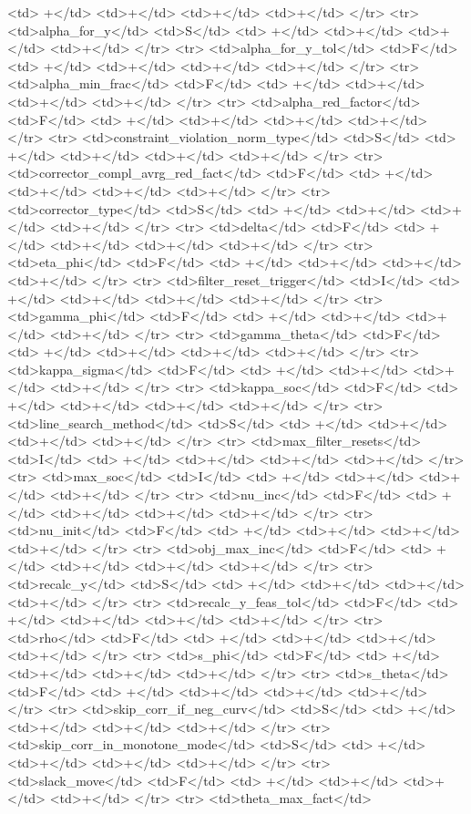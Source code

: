{{<td> +</td>
<td>+</td>
<td>+</td>
<td>+</td>
</tr>
<tr>
<td>alpha_for_y</td>
<td>S</td>
<td> +</td>
<td>+</td>
<td>+</td>
<td>+</td>
</tr>
<tr>
<td>alpha_for_y_tol</td>
<td>F</td>
<td> +</td>
<td>+</td>
<td>+</td>
<td>+</td>
</tr>
<tr>
<td>alpha_min_frac</td>
<td>F</td>
<td> +</td>
<td>+</td>
<td>+</td>
<td>+</td>
</tr>
<tr>
<td>alpha_red_factor</td>
<td>F</td>
<td> +</td>
<td>+</td>
<td>+</td>
<td>+</td>
</tr>
<tr>
<td>constraint_violation_norm_type</td>
<td>S</td>
<td> +</td>
<td>+</td>
<td>+</td>
<td>+</td>
</tr>
<tr>
<td>corrector_compl_avrg_red_fact</td>
<td>F</td>
<td> +</td>
<td>+</td>
<td>+</td>
<td>+</td>
</tr>
<tr>
<td>corrector_type</td>
<td>S</td>
<td> +</td>
<td>+</td>
<td>+</td>
<td>+</td>
</tr>
<tr>
<td>delta</td>
<td>F</td>
<td> +</td>
<td>+</td>
<td>+</td>
<td>+</td>
</tr>
<tr>
<td>eta_phi</td>
<td>F</td>
<td> +</td>
<td>+</td>
<td>+</td>
<td>+</td>
</tr>
<tr>
<td>filter_reset_trigger</td>
<td>I</td>
<td> +</td>
<td>+</td>
<td>+</td>
<td>+</td>
</tr>
<tr>
<td>gamma_phi</td>
<td>F</td>
<td> +</td>
<td>+</td>
<td>+</td>
<td>+</td>
</tr>
<tr>
<td>gamma_theta</td>
<td>F</td>
<td> +</td>
<td>+</td>
<td>+</td>
<td>+</td>
</tr>
<tr>
<td>kappa_sigma</td>
<td>F</td>
<td> +</td>
<td>+</td>
<td>+</td>
<td>+</td>
</tr>
<tr>
<td>kappa_soc</td>
<td>F</td>
<td> +</td>
<td>+</td>
<td>+</td>
<td>+</td>
</tr>
<tr>
<td>line_search_method</td>
<td>S</td>
<td> +</td>
<td>+</td>
<td>+</td>
<td>+</td>
</tr>
<tr>
<td>max_filter_resets</td>
<td>I</td>
<td> +</td>
<td>+</td>
<td>+</td>
<td>+</td>
</tr>
<tr>
<td>max_soc</td>
<td>I</td>
<td> +</td>
<td>+</td>
<td>+</td>
<td>+</td>
</tr>
<tr>
<td>nu_inc</td>
<td>F</td>
<td> +</td>
<td>+</td>
<td>+</td>
<td>+</td>
</tr>
<tr>
<td>nu_init</td>
<td>F</td>
<td> +</td>
<td>+</td>
<td>+</td>
<td>+</td>
</tr>
<tr>
<td>obj_max_inc</td>
<td>F</td>
<td> +</td>
<td>+</td>
<td>+</td>
<td>+</td>
</tr>
<tr>
<td>recalc_y</td>
<td>S</td>
<td> +</td>
<td>+</td>
<td>+</td>
<td>+</td>
</tr>
<tr>
<td>recalc_y_feas_tol</td>
<td>F</td>
<td> +</td>
<td>+</td>
<td>+</td>
<td>+</td>
</tr>
<tr>
<td>rho</td>
<td>F</td>
<td> +</td>
<td>+</td>
<td>+</td>
<td>+</td>
</tr>
<tr>
<td>s_phi</td>
<td>F</td>
<td> +</td>
<td>+</td>
<td>+</td>
<td>+</td>
</tr>
<tr>
<td>s_theta</td>
<td>F</td>
<td> +</td>
<td>+</td>
<td>+</td>
<td>+</td>
</tr>
<tr>
<td>skip_corr_if_neg_curv</td>
<td>S</td>
<td> +</td>
<td>+</td>
<td>+</td>
<td>+</td>
</tr>
<tr>
<td>skip_corr_in_monotone_mode</td>
<td>S</td>
<td> +</td>
<td>+</td>
<td>+</td>
<td>+</td>
</tr>
<tr>
<td>slack_move</td>
<td>F</td>
<td> +</td>
<td>+</td>
<td>+</td>
<td>+</td>
</tr>
<tr>
<td>theta_max_fact</td>
}}
